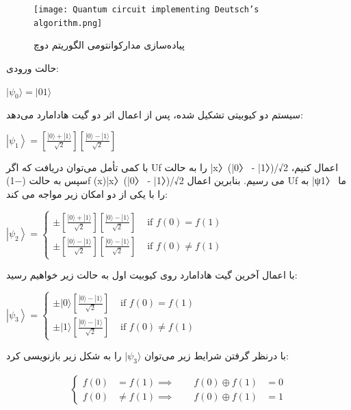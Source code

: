 \documentclass{book}
\begin{document}
\begin{figure}[ht]
	\centering
	\texttt{[image: Quantum circuit implementing Deutsch’s algorithm.png]}
	\caption{پیاده‌سازی مدارکوانتومی‌ الگوریتم دوچ}
\end{figure}

\newpage

حالت ورودی:\\
\begin{center}
	$\vert\psi_{0}\rangle = \vert01\rangle$
\end{center}

سیستم دو کیوبیتی تشکیل شده،‌ پس از اعمال اثر دو گیت هادامارد می‌دهد:\\

\begin{center}
$\left|\psi_1\right\rangle=\left[\frac{|0\rangle+|1\rangle}{\sqrt{2}}\right]\left[\frac{|0\rangle-|1\rangle}{\sqrt{2}}\right]$
\end{center}
با کمی تأمل می‌توان دریافت که اگر Uf را به حالت |x〉(|0〉 - |1〉)/√2 اعمال کنیم، سپس به حالت (−1)f (x)|x〉(|0〉 - |1〉)/√2 می رسیم. بنابرین اعمال Uf به |ψ1〉 ما را با یکی از دو امکان زیر مواجه می کند:
\begin{center}
	$\left|\psi_2\right\rangle= \begin{cases} \pm\left[\frac{|0\rangle+|1\rangle}{\sqrt{2}}\right]\left[\frac{|0\rangle-|1\rangle}{\sqrt{2}}\right] & \text { if } f(0)=f(1) \\ \pm\left[\frac{|0\rangle-|1\rangle}{\sqrt{2}}\right]\left[\frac{|0\rangle-|1\rangle}{\sqrt{2}}\right] & \text { if } f(0) \neq f(1) \end{cases}$
\end{center}
با اعمال آخرین گیت هادامارد روی کیوبیت اول به حالت زیر خواهیم رسید:
\begin{center}
	$\left|\psi_3\right\rangle= \begin{cases} \pm|0\rangle\left[\frac{|0\rangle-|1\rangle}{\sqrt{2}}\right] & \text { if } f(0)=f(1) \\ \pm|1\rangle\left[\frac{|0\rangle-|1\rangle}{\sqrt{2}}\right] & \text { if } f(0) \neq f(1) \end{cases}$
\end{center}
با درنظر گرفتن شرایط زیر می‌توان $\vert\psi_{3}\rangle$ را به شکل زیر بازنویسی کرد:

$$
\begin{aligned}
	\left\{
	\begin{aligned}
		f(0) &= f(1) 
		\implies \qquad f(0) \oplus f(1) &= 0\\
		f(0) &\neq f(1) 
		\implies \qquad f(0) \oplus f(1) &= 1
	\end{aligned}
	\right.
\end{aligned}$$
\end{document}
